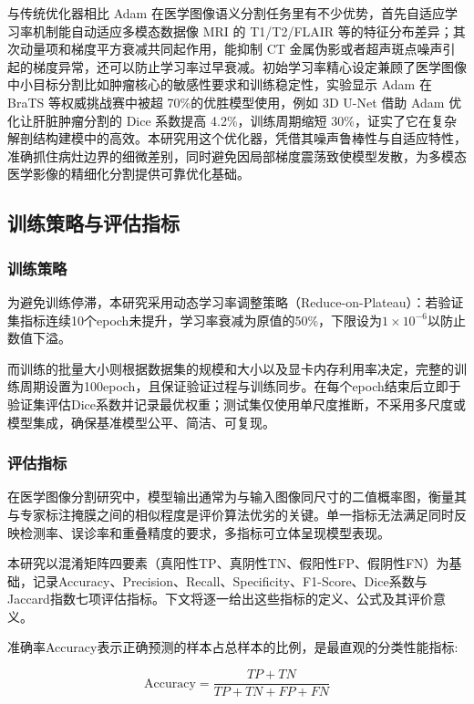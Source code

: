 与传统优化器相比 Adam 在医学图像语义分割任务里有不少优势，首先自适应学习率机制能自动适应多模态数据像 MRI 的 T1/T2/FLAIR 等的特征分布差异；其次动量项和梯度平方衰减共同起作用，能抑制 CT 金属伪影或者超声斑点噪声引起的梯度异常，还可以防止学习率过早衰减。初始学习率精心设定兼顾了医学图像中小目标分割比如肿瘤核心的敏感性要求和训练稳定性，实验显示 Adam 在 BraTS 等权威挑战赛中被超 70\%的优胜模型使用，例如 3D U-Net 借助 Adam 优化让肝脏肿瘤分割的 Dice 系数提高 4.2\%，训练周期缩短 30\%，证实了它在复杂解剖结构建模中的高效。本研究用这个优化器，凭借其噪声鲁棒性与自适应特性，准确抓住病灶边界的细微差别，同时避免因局部梯度震荡致使模型发散，为多模态医学影像的精细化分割提供可靠优化基础。

\subsection{训练策略与评估指标}

\subsubsection{训练策略}

为避免训练停滞，本研究采用动态学习率调整策略（Reduce-on-Plateau）：若验证集指标连续10个epoch未提升，学习率衰减为原值的50\%，下限设为$1 \times 10^{-6}$以防止数值下溢。

而训练的批量大小则根据数据集的规模和大小以及显卡内存利用率决定，完整的训练周期设置为100epoch，且保证验证过程与训练同步。在每个epoch结束后立即于验证集评估Dice系数并记录最优权重；测试集仅使用单尺度推断，不采用多尺度或模型集成，确保基准模型公平、简洁、可复现。

\subsubsection{评估指标}

在医学图像分割研究中，模型输出通常为与输入图像同尺寸的二值概率图，衡量其与专家标注掩膜之间的相似程度是评价算法优劣的关键。单一指标无法满足同时反映检测率、误诊率和重叠精度的要求，多指标可立体呈现模型表现。

本研究以混淆矩阵四要素（真阳性TP、真阴性TN、假阳性FP、假阴性FN）为基础，记录Accuracy、Precision、Recall、Specificity、F1-Score、Dice系数与Jaccard指数七项评估指标。下文将逐一给出这些指标的定义、公式及其评价意义。

准确率Accuracy表示正确预测的样本占总样本的比例，是最直观的分类性能指标:

\begin{equation}
    \mathrm{Accuracy}=\frac{TP+TN}{TP+TN+FP+FN}
\end{equation}


